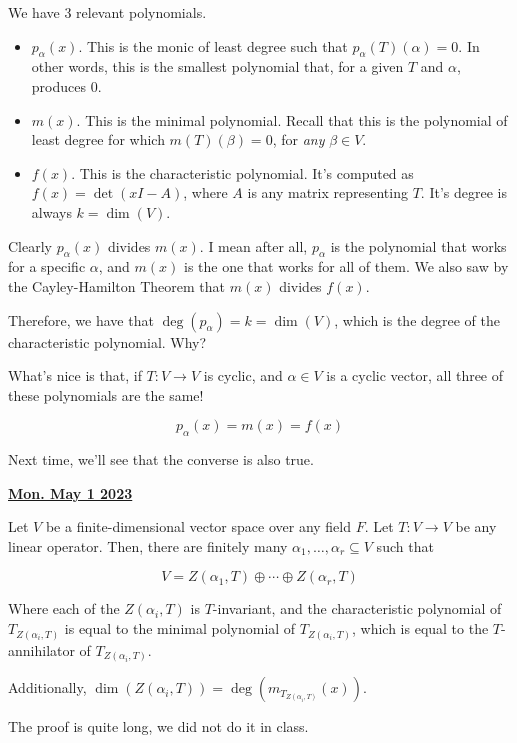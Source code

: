 \documentclass[12pt]{article}
\renewcommand{\date}[1]{\underline{\bf #1}}
\begin{document}
  We have 3 relevant polynomials.

  \begin{itemize}
    \item $p_\alpha(x)$. This is the monic of least degree such that
      $p_\alpha(T)(\alpha) = 0$. In other words, this is the smallest polynomial
      that, for a given $T$ and $\alpha$, produces 0.

    \item $m(x)$. This is the minimal polynomial. Recall that this is the
      polynomial of least degree for which $m(T)(\beta) = 0$, for {\it any}
      $\beta \in V$.

    \item $f(x)$. This is the characteristic polynomial. It's computed as $f(x)
      = \det(xI - A)$, where $A$ is any matrix representing $T$. It's degree is
      always $k = \dim(V)$.
  \end{itemize}

  Clearly $p_\alpha(x)$ divides $m(x)$. I mean after all, $p_\alpha$ is the
  polynomial that works for a specific $\alpha$, and $m(x)$ is the one that
  works for all of them. We also saw by the Cayley-Hamilton Theorem that $m(x)$
  divides $f(x)$.

  Therefore, we have that $\deg(p_\alpha) = k = \dim(V)$, which is the degree of
  the characteristic polynomial. \QUESTION{} Why?

  What's nice is that, if $T: V \to V$ is cyclic, and $\alpha \in V$ is a cyclic
  vector, all three of these polynomials are the same!

  \[
    p_\alpha(x) = m(x) = f(x)
  \]

  Next time, we'll see that the converse is also true.

  \date{Mon. May 1 2023}

  {
    Let $V$ be a finite-dimensional vector space over any field $F$. Let $T: V
    \to V$ be any linear operator. Then, there are finitely many $\alpha_1,
    \dots, \alpha_r \subseteq V$ such that

    \[
      V = Z(\alpha_1, T) \oplus \cdots \oplus Z(\alpha_r, T)
    \]

    Where each of the $Z(\alpha_i, T)$ is $T$-invariant, and the characteristic
    polynomial of $T_{Z(\alpha_i, T)}$ is equal to the minimal polynomial of
    $T_{Z(\alpha_i, T)}$, which is equal to the $T$-annihilator of
    $T_{Z(\alpha_i, T)}$.

    Additionally, $\dim(Z(\alpha_i, T)) = \deg(m_{T_{Z(\alpha_i, T)}}(x))$.
  }
  {
    The proof is quite long, we did not do it in class.
  }
\end{document}

